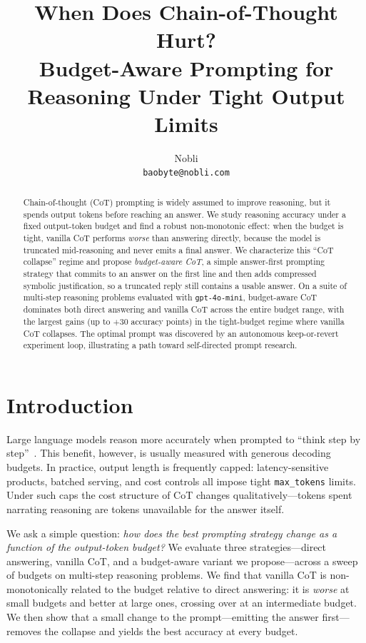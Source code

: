 \documentclass{article}
\title{When Does Chain-of-Thought Hurt?\\
Budget-Aware Prompting for Reasoning Under Tight Output Limits}
\author{%
  Nobli \\
  \texttt{baobyte@nobli.com} \\
}
\begin{document}
\maketitle

\begin{abstract}
Chain-of-thought (CoT) prompting is widely assumed to improve reasoning, but it
spends output tokens before reaching an answer. We study reasoning accuracy
under a fixed output-token budget and find a robust non-monotonic effect:
when the budget is tight, vanilla CoT performs \emph{worse} than answering
directly, because the model is truncated mid-reasoning and never emits a final
answer. We characterize this ``CoT collapse'' regime and propose
\emph{budget-aware CoT}, a simple answer-first prompting strategy that commits
to an answer on the first line and then adds compressed symbolic justification,
so a truncated reply still contains a usable answer. On a suite of multi-step
reasoning problems evaluated with \texttt{gpt-4o-mini}, budget-aware CoT
dominates both direct answering and vanilla CoT across the entire budget range,
with the largest gains (up to $+30$ accuracy points) in the tight-budget regime
where vanilla CoT collapses. The optimal prompt was discovered by an autonomous
keep-or-revert experiment loop, illustrating a path toward self-directed prompt
research.
\end{abstract}

\section{Introduction}
\label{sec:intro}
Large language models reason more accurately when prompted to ``think step by
step''~\citep{wei2022chain}. This benefit, however, is usually measured with
generous decoding budgets. In practice, output length is frequently capped:
latency-sensitive products, batched serving, and cost controls all impose tight
\texttt{max\_tokens} limits. Under such caps the cost structure of CoT changes
qualitatively---tokens spent narrating reasoning are tokens unavailable for the
answer itself.

We ask a simple question: \emph{how does the best prompting strategy change as a
function of the output-token budget?} We evaluate three strategies---direct
answering, vanilla CoT, and a budget-aware variant we propose---across a sweep of
budgets on multi-step reasoning problems. We find that vanilla CoT is
non-monotonically related to the budget relative to direct answering: it is
\emph{worse} at small budgets and better at large ones, crossing over at an
intermediate budget. We then show that a small change to the prompt---emitting
the answer first---removes the collapse and yields the best accuracy at every
budget.
\end{document}
